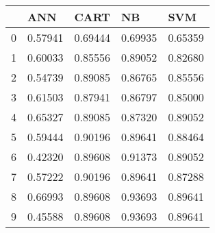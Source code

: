 \begin{tabular}{|l|l|l|l|l|}
\toprule
{} &      ANN &     CART &       NB &      SVM \\
\midrule
0 &  0.57941 &  0.69444 &  0.69935 &  0.65359 \\
1 &  0.60033 &  0.85556 &  0.89052 &  0.82680 \\
2 &  0.54739 &  0.89085 &  0.86765 &  0.85556 \\
3 &  0.61503 &  0.87941 &  0.86797 &  0.85000 \\
4 &  0.65327 &  0.89085 &  0.87320 &  0.89052 \\
5 &  0.59444 &  0.90196 &  0.89641 &  0.88464 \\
6 &  0.42320 &  0.89608 &  0.91373 &  0.89052 \\
7 &  0.57222 &  0.90196 &  0.89641 &  0.87288 \\
8 &  0.66993 &  0.89608 &  0.93693 &  0.89641 \\
9 &  0.45588 &  0.89608 &  0.93693 &  0.89641 \\
\bottomrule
\end{tabular}
